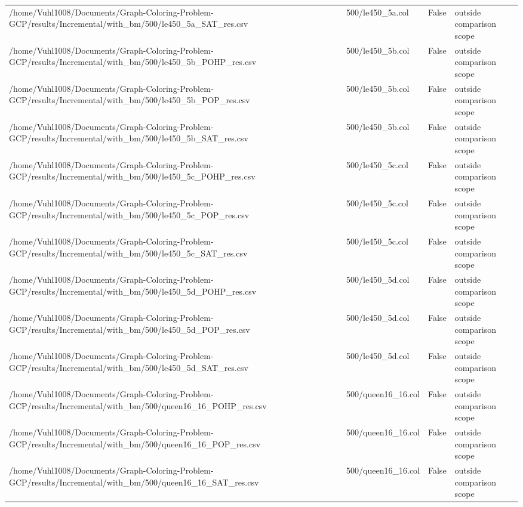 \begin{table}[htbp]
\begin{tabular}{llll}
/home/Vuhl1008/Documents/Graph-Coloring-Problem-GCP/results/Incremental/with\_bm/500/le450\_5a\_SAT\_res.csv & 500/le450\_5a.col & False & outside comparison scope \\
/home/Vuhl1008/Documents/Graph-Coloring-Problem-GCP/results/Incremental/with\_bm/500/le450\_5b\_POHP\_res.csv & 500/le450\_5b.col & False & outside comparison scope \\
/home/Vuhl1008/Documents/Graph-Coloring-Problem-GCP/results/Incremental/with\_bm/500/le450\_5b\_POP\_res.csv & 500/le450\_5b.col & False & outside comparison scope \\
/home/Vuhl1008/Documents/Graph-Coloring-Problem-GCP/results/Incremental/with\_bm/500/le450\_5b\_SAT\_res.csv & 500/le450\_5b.col & False & outside comparison scope \\
/home/Vuhl1008/Documents/Graph-Coloring-Problem-GCP/results/Incremental/with\_bm/500/le450\_5c\_POHP\_res.csv & 500/le450\_5c.col & False & outside comparison scope \\
/home/Vuhl1008/Documents/Graph-Coloring-Problem-GCP/results/Incremental/with\_bm/500/le450\_5c\_POP\_res.csv & 500/le450\_5c.col & False & outside comparison scope \\
/home/Vuhl1008/Documents/Graph-Coloring-Problem-GCP/results/Incremental/with\_bm/500/le450\_5c\_SAT\_res.csv & 500/le450\_5c.col & False & outside comparison scope \\
/home/Vuhl1008/Documents/Graph-Coloring-Problem-GCP/results/Incremental/with\_bm/500/le450\_5d\_POHP\_res.csv & 500/le450\_5d.col & False & outside comparison scope \\
/home/Vuhl1008/Documents/Graph-Coloring-Problem-GCP/results/Incremental/with\_bm/500/le450\_5d\_POP\_res.csv & 500/le450\_5d.col & False & outside comparison scope \\
/home/Vuhl1008/Documents/Graph-Coloring-Problem-GCP/results/Incremental/with\_bm/500/le450\_5d\_SAT\_res.csv & 500/le450\_5d.col & False & outside comparison scope \\
/home/Vuhl1008/Documents/Graph-Coloring-Problem-GCP/results/Incremental/with\_bm/500/queen16\_16\_POHP\_res.csv & 500/queen16\_16.col & False & outside comparison scope \\
/home/Vuhl1008/Documents/Graph-Coloring-Problem-GCP/results/Incremental/with\_bm/500/queen16\_16\_POP\_res.csv & 500/queen16\_16.col & False & outside comparison scope \\
/home/Vuhl1008/Documents/Graph-Coloring-Problem-GCP/results/Incremental/with\_bm/500/queen16\_16\_SAT\_res.csv & 500/queen16\_16.col & False & outside comparison scope \\

\end{tabular}
\end{table}
